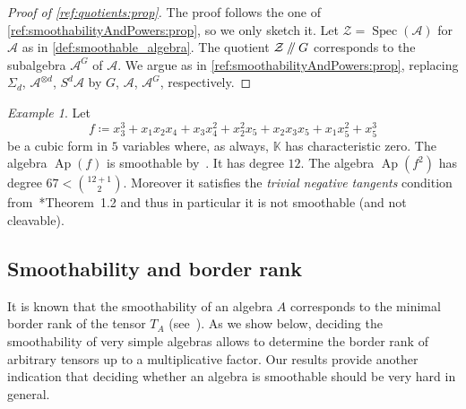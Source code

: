 \documentclass[a4paper,11pt,reqno]{amsart}
\newcommand{\calA}{\mathcal{A}}
\newcommand{\calZ}{\mathcal{Z}}
\newcommand{\bbK}{\mathbb{K}}
\DeclareMathOperator{\Ap}{Ap}
\DeclareMathOperator{\Spec}{Spec}
\numberwithin{equation}{section}
\theoremstyle{definition}
\theoremstyle{plain}
\theoremstyle{remark}
\newtheorem{exam}[defn]{Example}
\newcommand{\goodquotient}{\mathbin{
  \mathchoice{\left/\mkern-6mu\right/}%
    {/\mkern-5mu/}%
    {/\mkern-5mu/}%
    {/\mkern-5mu/}}}%
\begin{document}
\begin{proof}[Proof of \autoref{ref:quotients:prop}]
    The proof follows the one of \autoref{ref:smoothabilityAndPowers:prop}, so
    we only sketch it. Let $\calZ = \Spec(\calA)$ for $\calA$ as in
    \autoref{def:smoothable_algebra}. The quotient $\calZ \goodquotient G$
    corresponds to the subalgebra $\calA^{G}$ of $\calA$.
    We argue as in \autoref{ref:smoothabilityAndPowers:prop}, replacing
    $\Sigma_d$, $\calA^{\otimes d}$, $S^d \calA$ by $G$, $\calA$, $\calA^G$,
    respectively.
\end{proof}

\begin{exam}\label{ex:squareNotSmoothable}
    Let \[f \coloneqq x_3^3+x_1x_2x_4+x_3x_4^2+x_2^2x_5+x_2x_3x_5+x_1x_5^2+x_5^3\] be a
    cubic form in $5$ variables where, as always, $\bbK$ has characteristic
    zero. The algebra $\Ap(f)$ is
    smoothable by~\cites{BCR22, Jel14}.
    It has degree $12$. The algebra $\Ap(f^2)$ has degree $67 <
    \binom{12+1}{2}$. Moreover it satisfies the \emph{trivial negative
    tangents} condition from~\cite{Jel19}*{Theorem~1.2} and
    thus in particular it is not smoothable (and not cleavable).
\end{exam}
\subsection{Smoothability and border rank}\label{sec:smoothabilityandbrank}
{It is known that the smoothability} of an algebra $A$ corresponds to {the minimal} border rank of the tensor $T_A$
(see~\cites{BL16, landsberg2017abelian}). As we show below, deciding {the smoothability} of very simple algebras allows to
determine {the border} rank of arbitrary tensors up to a multiplicative factor. Our results provide another indication that deciding {whether} an algebra is smoothable should be {very hard in general.}
\end{document}
